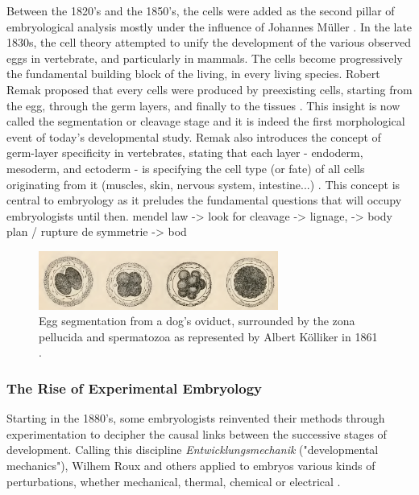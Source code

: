   Between the 1820's and the 1850's, the cells were added as the second pillar of embryological analysis mostly under the influence of Johannes Müller \cite{Hopwood:2008wy}. In the late 1830s, the cell theory attempted to unify the development of the various observed eggs in vertebrate, and particularly in mammals. The cells become progressively the fundamental building block of the living, in every living species. Robert Remak proposed that every cells were produced by preexisting cells, starting from the egg, through the germ layers, and finally to the tissues \cite{Lagunoff:2002gw}. This insight is now called the segmentation or cleavage stage and it is indeed the first morphological event of today's developmental study. Remak also introduces the concept of germ-layer specificity in vertebrates, stating that each layer - endoderm, mesoderm, and ectoderm - is specifying the cell type (or fate) of all cells originating from it (muscles, skin, nervous system, intestine...) \cite{Remak:1855tc}. This concept is central to embryology as it preludes the fundamental questions that will occupy embryologists until then.   mendel law  -> look for cleavage  -> lignage,  -> body plan / rupture de symmetrie  -> bod  
\begin{figure}
\begin{center}
\includegraphics[width=0.7\textwidth]{../../images/Development_Review/dog_segmentation_kolliker_1861.png}
\end{center}
\caption{Egg segmentation from a dog's oviduct, surrounded by the zona pellucida and spermatozoa as represented by Albert Kölliker in 1861 \cite{Kolliker:1861uj}.}
\label{Development_Review_dog_segmentation_kolliker_1861}
\end{figure}


\subsubsection{The Rise of Experimental Embryology}


Starting in the 1880's, some embryologists reinvented their methods through experimentation to decipher the causal links between the successive stages of development. Calling this discipline \textit{Entwicklungsmechanik} ("developmental mechanics"), Wilhem Roux and others applied to embryos various kinds of perturbations, whether mechanical, thermal, chemical or electrical \cite{Hopwood:2011gt}.

